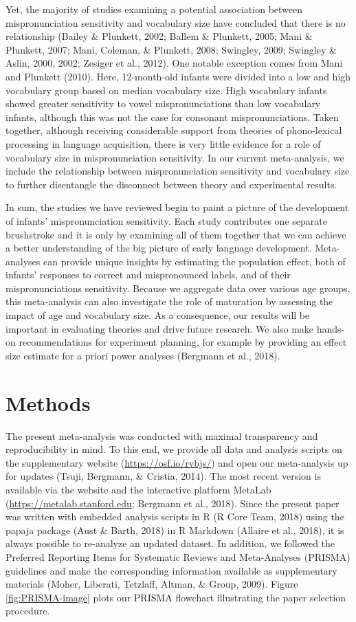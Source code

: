 \documentclass[man]{apa6}
\theoremstyle{definition}
\theoremstyle{definition}
\theoremstyle{definition}
\theoremstyle{remark}
\begin{document}
Yet, the majority of studies examining a potential association between
mispronunciation sensitivity and vocabulary size have concluded that
there is no relationship (Bailey \& Plunkett, 2002; Ballem \& Plunkett,
2005; Mani \& Plunkett, 2007; Mani, Coleman, \& Plunkett, 2008;
Swingley, 2009; Swingley \& Aslin, 2000, 2002; Zesiger et al., 2012).
One notable exception comes from Mani and Plunkett (2010). Here,
12-month-old infants were divided into a low and high vocabulary group
based on median vocabulary size. High vocabulary infants showed greater
sensitivity to vowel mispronunciations than low vocabulary infants,
although this was not the case for consonant mispronunciations. Taken
together, although receiving considerable support from theories of
phono-lexical processing in language acquisition, there is very little
evidence for a role of vocabulary size in mispronunciation sensitivity.
In our current meta-analysis, we include the relationship between
mispronunciation sensitivity and vocabulary size to further disentangle
the disconnect between theory and experimental results.

In sum, the studies we have reviewed begin to paint a picture of the
development of infants' mispronunciation sensitivity. Each study
contributes one separate brushstroke and it is only by examining all of
them together that we can achieve a better understanding of the big
picture of early language development. Meta-analyses can provide unique
insights by estimating the population effect, both of infants' responses
to correct and mispronounced labels, and of their mispronunciations
sensitivity. Because we aggregate data over various age groups, this
meta-analysis can also investigate the role of maturation by assessing
the impact of age and vocabulary size. As a consequence, our results
will be important in evaluating theories and drive future research. We
also make hands-on recommendations for experiment planning, for example
by providing an effect size estimate for a priori power analyses
(Bergmann et al., 2018).

\section{Methods}\label{methods}

The present meta-analysis was conducted with maximal transparency and
reproducibility in mind. To this end, we provide all data and analysis
scripts on the supplementary website (\url{https://osf.io/rvbjs/}) and
open our meta-analysis up for updates (Tsuji, Bergmann, \& Cristia,
2014). The most recent version is available via the website and the
interactive platform MetaLab (\url{https://metalab.stanford.edu};
Bergmann et al., 2018). Since the present paper was written with
embedded analysis scripts in R (R Core Team, 2018) using the papaja
package (Aust \& Barth, 2018) in R Markdown (Allaire et al., 2018), it
is always possible to re-analyze an updated dataset. In addition, we
followed the Preferred Reporting Items for Systematic Reviews and
Meta-Analyses (PRISMA) guidelines and make the corresponding information
available as supplementary materials (Moher, Liberati, Tetzlaff, Altman,
\& Group, 2009). Figure \ref{fig:PRISMA-image} plots our PRISMA
flowchart illustrating the paper selection procedure.
\end{document}
